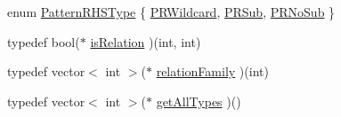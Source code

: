 \begin{DoxyCompactItemize}
enum \hyperlink{class_rules_of_engagement_a97613ded2253a252de010070d7c54ac1}{Pattern\-R\-H\-S\-Type} \{ \hyperlink{class_rules_of_engagement_a97613ded2253a252de010070d7c54ac1ab823799dfda20af778a3848abfc46e84}{P\-R\-Wildcard}, 
\hyperlink{class_rules_of_engagement_a97613ded2253a252de010070d7c54ac1a956642bd04a30d5d37ea95257f79d331}{P\-R\-Sub}, 
\hyperlink{class_rules_of_engagement_a97613ded2253a252de010070d7c54ac1a106d4eaf9b0bc4cefdee0e20e244e06a}{P\-R\-No\-Sub}
 \}
\item 
typedef bool($\ast$ \hyperlink{class_rules_of_engagement_aad838c0ef69d7c4ee9bef23a431ff6c1}{is\-Relation} )(int, int)
\item 
typedef vector$<$ int $>$($\ast$ \hyperlink{class_rules_of_engagement_a81832aa421c58fe508e3ace862e1288e}{relation\-Family} )(int)
\item 
typedef vector$<$ int $>$($\ast$ \hyperlink{class_rules_of_engagement_a1a051f48865a7a4d7f07f0a89f16aafe}{get\-All\-Types} )()
\end{DoxyCompactItemize}
